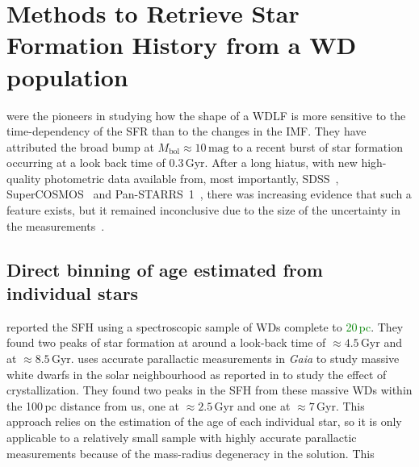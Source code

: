 \documentclass[fleqn,usenatbib]{mnras}
\begin{document}
\section{Methods to Retrieve Star Formation History from a WD population}
\citet{1990ApJ...352..605N} were the pioneers in studying how the shape of
a WDLF is more sensitive to the time-dependency of the SFR than to the changes
in the IMF. They have attributed the broad bump at
$M_{\mathrm{bol}} \approx 10\,\mathrm{mag}$ to a recent burst of star formation
occurring at a look back time of 0.3\,Gyr. After a long hiatus, with new
high-quality photometric data available from, most importantly, 
SDSS~\citep{2000AJ....120.1579Y}, SuperCOSMOS~\citep{2001MNRAS.326.1279H} and
Pan-STARRS~1~\citep{2016arXiv161205560C}, there was increasing evidence that
such a feature exists, but it remained inconclusive due to the size of the
uncertainty in the  measurements~\citep{2006AJ....131..571H,
2011MNRAS.417...93R, 2019MNRAS.482..715L, 2024MNRAS.535.3611Q}.

\subsection{Direct binning of age estimated from individual stars}
\citet[][hereafter, T14]{2014ApJ...791...92T} reported the SFH using a
spectroscopic sample of WDs complete to \textcolor{green}{20\,pc}. They found two peaks of star
formation at around a look-back time of $\approx4.5$\,Gyr and at 
$\approx8.5$\,Gyr. \citet{2019ApJ...878L..11I} uses accurate parallactic 
measurements in \textit{Gaia} to study massive white dwarfs in the solar
neighbourhood as reported in \citet{2019Natur.565..202T} to study the effect of
crystallization. They found two peaks in the SFH from these massive WDs within
the 100\,pc distance from us, one at $\approx2.5$\,Gyr and one at
$\approx7$\,Gyr. This approach relies on the estimation of the age of each
individual star, so it is only applicable to a relatively small sample with
highly accurate parallactic measurements because of the mass-radius degeneracy
in the solution. This

\end{document}
